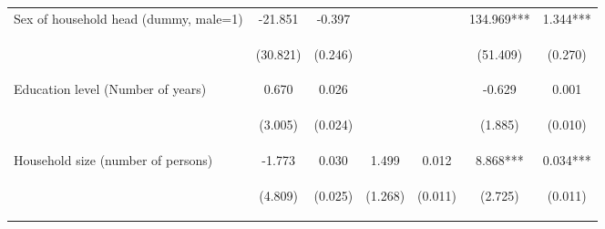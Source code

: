 \begin{center}
\begin{tabular}{lcccccc}
Sex of household head (dummy, male=1) & -21.851 & -0.397 &  &  & 134.969*** & 1.344*** \\
\vspace{4pt} & \begin{footnotesize}(30.821)\end{footnotesize} & \begin{footnotesize}(0.246)\end{footnotesize} & \begin{footnotesize}\end{footnotesize} & \begin{footnotesize}\end{footnotesize} & \begin{footnotesize}(51.409)\end{footnotesize} & \begin{footnotesize}(0.270)\end{footnotesize} \\
Education level (Number of years) & 0.670 & 0.026 &  &  & -0.629 & 0.001 \\
\vspace{4pt} & \begin{footnotesize}(3.005)\end{footnotesize} & \begin{footnotesize}(0.024)\end{footnotesize} & \begin{footnotesize}\end{footnotesize} & \begin{footnotesize}\end{footnotesize} & \begin{footnotesize}(1.885)\end{footnotesize} & \begin{footnotesize}(0.010)\end{footnotesize} \\
Household size (number of persons) & -1.773 & 0.030 & 1.499 & 0.012 & 8.868*** & 0.034*** \\
\vspace{4pt} & \begin{footnotesize}(4.809)\end{footnotesize} & \begin{footnotesize}(0.025)\end{footnotesize} & \begin{footnotesize}(1.268)\end{footnotesize} & \begin{footnotesize}(0.011)\end{footnotesize} & \begin{footnotesize}(2.725)\end{footnotesize} & \begin{footnotesize}(0.011)\end{footnotesize} \\

\end{tabular}
\end{center}
